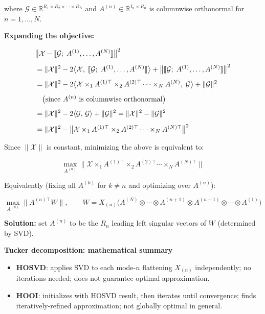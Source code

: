 \documentclass[12pt]{article}
\newcommand{\T}[1]{\mathcal{#1}}   %
\begin{document}
where $\T{G} \in \mathbb{R}^{R_1 \times R_2 \times \cdots \times R_N}$
and $A^{(n)} \in \mathbb{R}^{I_n \times R_n}$ is columnwise orthonormal
for $n = 1, \ldots, N$.

\medskip
\noindent\textbf{Expanding the objective:}

\begin{align}
&\bigl\|\T{X} - \llbracket \T{G};\; A^{(1)}, \ldots, A^{(N)} \rrbracket\bigr\|^{2} \notag\\[4pt]
&= \|\T{X}\|^{2}
   - 2\bigl\langle \T{X},\; \llbracket \T{G};\; A^{(1)}, \ldots, A^{(N)} \rrbracket \bigr\rangle
   + \bigl\|\llbracket \T{G};\; A^{(1)}, \ldots, A^{(N)} \rrbracket\bigr\|^{2} \notag\\[4pt]
&= \|\T{X}\|^{2}
   - 2\bigl\langle
       \T{X} \times_1 A^{(1)\top} \times_2 A^{(2)\top} \cdots \times_N A^{(N)},\;
       \T{G}
     \bigr\rangle
   + \|\T{G}\|^{2} \notag\\[4pt]
&\quad\bigl(\text{since } A^{(n)} \text{ is columnwise orthonormal}\bigr) \notag\\[4pt]
&= \|\T{X}\|^{2} - 2\langle \T{G},\, \T{G}\rangle + \|\T{G}\|^{2}
 = \|\T{X}\|^{2} - \|\T{G}\|^{2} \notag\\[4pt]
&= \|\T{X}\|^{2}
   - \bigl\|\T{X} \times_1 A^{(1)\top} \times_2 A^{(2)\top} \cdots \times_N A^{(N)\top}\bigr\|^{2}
\end{align}

\noindent Since $\|\T{X}\|$ is constant, minimizing the above is equivalent to:

\begin{equation}
\max_{A^{(n)}}
\bigl\|\T{X} \times_1 A^{(1)\top} \times_2 A^{(2)\top} \cdots \times_N A^{(N)\top}\bigr\|
\end{equation}

\noindent Equivalently (fixing all $A^{(k)}$ for $k \neq n$ and optimizing over $A^{(n)}$):

\begin{equation}
\max_{A^{(n)}} \bigl\|A^{(n)\top} W\bigr\|,
\qquad
W = X_{(n)}\bigl(A^{(N)} \otimes \cdots \otimes A^{(n+1)} \otimes A^{(n-1)} \otimes \cdots \otimes A^{(1)}\bigr)
\end{equation}

\noindent\textbf{Solution:} set $A^{(n)}$ to be the $R_n$ leading left singular vectors of $W$
(determined by SVD).

\bigskip
\noindent\textbf{Tucker decomposition: mathematical summary}
\begin{itemize}[itemsep=4pt]
  \item \textbf{HOSVD}: applies SVD to each mode-$n$ flattening $X_{(n)}$ independently;
        no iterations needed; does not guarantee optimal approximation.
  \item \textbf{HOOI}: initializes with HOSVD result, then iterates until convergence;
        finds iteratively-refined approximation; not globally optimal in general.
\end{itemize}
\end{document}
